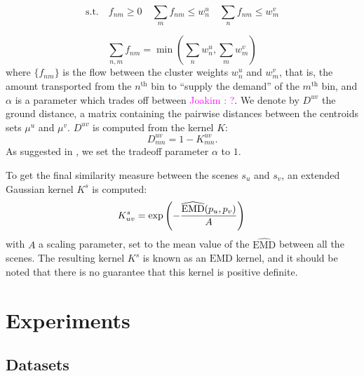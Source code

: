 \documentclass[journal]{IEEEtran}
\newcommand*{\EMD}{\mathrm{EMD}}
\newcommand{\ja}[1]{\textcolor{magenta}{Joakim : #1}}
\begin{document}
\begin{equation*}
\mathrm{s.t.} \quad f_{nm}\geq0 \quad \sum\limits_{m} f_{nm} \leq w_n^u \quad \sum\limits_{n} f_{nm} \leq w_m^v
\end{equation*}

\begin{equation*}
\sum\limits_{n,m}f_{nm} = \min\left( \sum\limits_{n} w_n^u ,\sum\limits_{m} w_m^v \right)
\end{equation*} 
where $\lbrace f_{nm} \rbrace$ is the flow between the cluster weights $w_n^u$ and $w_m^v$, that is, the amount transported from the $n^{\textrm{th}}$ bin to ``supply the demand'' of the $m^\textrm{th}$ bin, and $\alpha$ is a parameter which trades off between \ja{?}. We denote by $D^{uv}$ the ground distance, a matrix containing the pairwise distances between the centroids sets $\mu^u$ and $\mu^v$. $D^{uv}$ is computed from the kernel $K$:
\begin{equation*}
D_{mn}^{uv}=1-K_{mn}^{uv}.
\end{equation*}
As suggested in \cite{pele2009fast}, we set the tradeoff parameter $\alpha$ to $1$.

To get the final similarity measure between the scenes $s_u$ and $s_v$, an extended Gaussian kernel $K^s$ is computed: %
\begin{equation}
\label{eq:ks}
K_{uv}^s = \exp\left( - \dfrac{\widehat{\EMD}(p_u,p_v)}{A} \right) \\
\end{equation}
with $A$ a scaling parameter, set to the mean value of the $\widehat{\EMD}$ between all the scenes. The resulting kernel $K^s$ is known as an $\EMD$ kernel, and it should be noted that there is no guarantee that this kernel is positive definite.

\section{Experiments}
\label{sec:experiments}

\subsection{Datasets}
\end{document}
